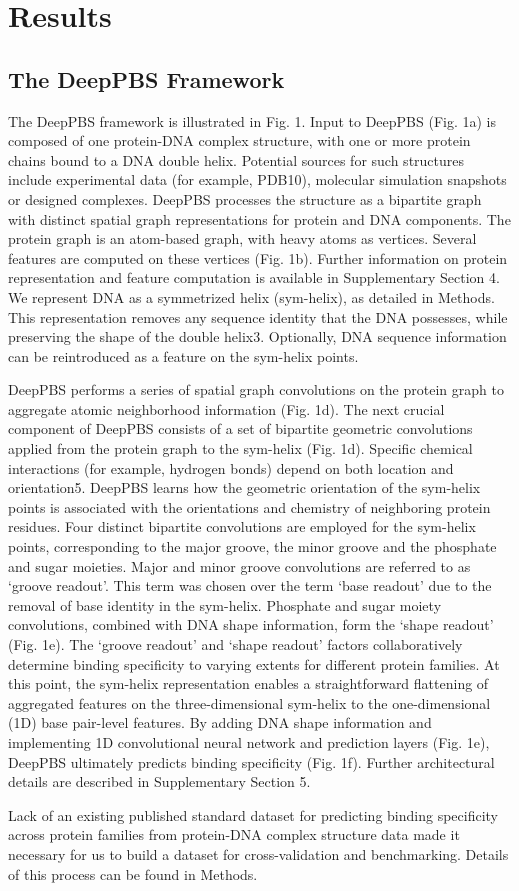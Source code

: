 \section{Results}
\subsection{The DeepPBS Framework}
The DeepPBS framework is illustrated in Fig. 1. Input to DeepPBS (Fig. 1a) is composed of one protein-DNA complex structure, with one or more protein chains bound to a DNA double helix. Potential sources for such structures include experimental data (for example, PDB10), molecular simulation snapshots or designed complexes. DeepPBS processes the structure as a bipartite graph with distinct spatial graph representations for protein and DNA components. The protein graph is an atom-based graph, with heavy atoms as vertices. Several features are computed on these vertices (Fig. 1b). Further information on protein representation and feature computation is available in Supplementary Section 4. We represent DNA as a symmetrized helix (sym-helix), as detailed in Methods. This representation removes any sequence identity that the DNA possesses, while preserving the shape of the double helix3. Optionally, DNA sequence information can be reintroduced as a feature on the sym-helix points.
\par
DeepPBS performs a series of spatial graph convolutions on the protein graph to aggregate atomic neighborhood information (Fig. 1d). The next crucial component of DeepPBS consists of a set of bipartite geometric convolutions applied from the protein graph to the sym-helix (Fig. 1d). Specific chemical interactions (for example, hydrogen bonds) depend on both location and orientation5. DeepPBS learns how the geometric orientation of the sym-helix points is associated with the orientations and chemistry of neighboring protein residues. Four distinct bipartite convolutions are employed for the sym-helix points, corresponding to the major groove, the minor groove and the phosphate and sugar moieties. Major and minor groove convolutions are referred to as ‘groove readout’. This term was chosen over the term ‘base readout’ due to the removal of base identity in the sym-helix. Phosphate and sugar moiety convolutions, combined with DNA shape information, form the ‘shape readout’ (Fig. 1e). The ‘groove readout’ and ‘shape readout’ factors collaboratively determine binding specificity to varying extents for different protein families. At this point, the sym-helix representation enables a straightforward flattening of aggregated features on the three-dimensional sym-helix to the one-dimensional (1D) base pair-level features. By adding DNA shape information and implementing 1D convolutional neural network and prediction layers (Fig. 1e), DeepPBS ultimately predicts binding specificity (Fig. 1f). Further architectural details are described in Supplementary Section 5.
\par
Lack of an existing published standard dataset for predicting binding specificity across protein families from protein-DNA complex structure data made it necessary for us to build a dataset for cross-validation and benchmarking. Details of this process can be found in Methods.

